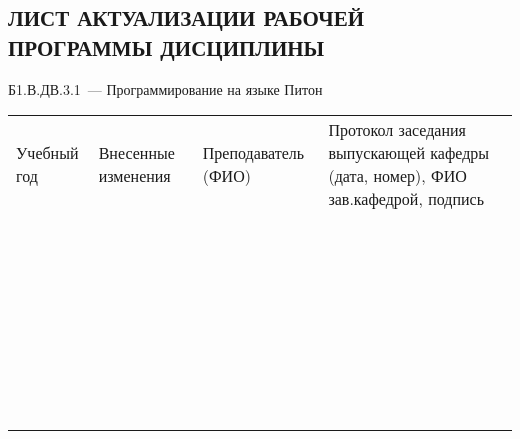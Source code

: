 \documentclass[a4paper,12pt]{article}
\begin{document}
\newpage
\begin{center}
\section*{ЛИСТ АКТУАЛИЗАЦИИ РАБОЧЕЙ ПРОГРАММЫ ДИСЦИПЛИНЫ}
Б1.В.ДВ.3.1\ --- Программирование на языке Питон 
\end{center}

  \noindent
  \begin{tabular}{|p{15mm}|p{67mm}|p{25mm}|p{41mm}|}
    \hline
    \small\centering
    Учебный год 
    & \small\centering
    Внесенные изменения 
    & \small\centering
    Преподаватель (ФИО) 
    & \small\centering\arraybackslash
    Протокол заседания выпускающей кафедры (дата, номер), ФИО зав.кафедрой, подпись \\
    & & & \\\hline
    & & & \\\hline
    & & & \\\hline
    & & & \\\hline
    & & & \\\hline
    & & & \\\hline
    & & & \\\hline
    & & & \\\hline
    & & & \\\hline
    & & & \\\hline
    & & & \\\hline
    & & & \\\hline
    & & & \\\hline
    & & & \\\hline
    & & & \\\hline
    & & & \\\hline
    & & & \\\hline
    & & & \\\hline
    & & & \\\hline
    & & & \\\hline
    & & & \\\hline
    & & & \\\hline
    & & & \\\hline
    & & & \\\hline
    & & & \\\hline
    & & & \\\hline
    & & & \\\hline
    & & & \\\hline
    & & & \\\hline
    & & & \\\hline
    & & & \\\hline
    & & & \\\hline
    & & & \\\hline
    & & & \\\hline
    & & & \\\hline
    & & & \\\hline
  \end{tabular}
\end{document}
